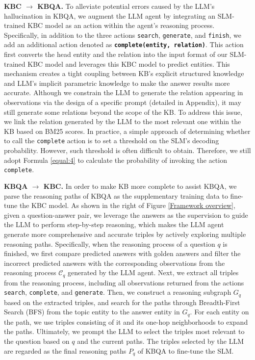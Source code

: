 \documentclass[11pt]{article}
\begin{document}
\textbf{KBC $\rightarrow$ KBQA.}\label{sec:3.3.1}
To alleviate potential errors caused by the LLM's hallucination in KBQA, we augment the LLM agent by integrating an SLM-trained KBC model as an action within the agent's reasoning process. Specifically, in addition to the three actions \texttt{search}, \texttt{generate}, and \texttt{finish}, we add an additional action denoted as \textbf{\texttt{complete(entity, relation)}}. This action first converts the head entity and the relation into the input format of our SLM-trained KBC model and leverages this KBC model to predict entities. This mechanism creates a tight coupling between KB's explicit structured knowledge and LLM's implicit parametric knowledge to make the answer results more accurate.
Although we constrain the LLM to generate the relation appearing in observations via the design of a specific prompt (detailed in Appendix), it may still generate some relations beyond the scope of the KB. 
To address this issue, we link the relation generated by the LLM to the most relevant one within the KB based on BM25 scores. 
In practice, a simple approach of determining whether to call the \texttt{complete} action is to set a threshold on the SLM’s decoding probability. However, such threshold is often difficult to obtain. Therefore, we still adopt Formula \ref{equal:4} to calculate the probability of invoking the action \texttt{complete}.

\textbf{KBQA $\rightarrow$ KBC.}\label{sec:3.3.2} 
In order to make KB more complete to assist KBQA, we parse the reasoning paths of KBQA as the supplementary training data to fine-tune the KBC model. As shown in the right of Figure \ref{Framework overview}, given a question-answer pair, we leverage the answers as the supervision to guide the LLM to perform step-by-step reasoning, which makes the LLM agent generate more comprehensive and accurate triples by actively exploring multiple reasoning paths. Specifically, when the reasoning process of a question $q$ is finished, we first compare predicted answers with golden answers and filter the incorrect predicted answers with the corresponding observations from the reasoning process $\mathcal{C}_q$ generated by the LLM agent. 
Next, we extract all triples from the reasoning process, including all observations returned from the actions \texttt{search}, \texttt{complete}, and \texttt{generate}. Then, we construct a reasoning subgraph $G_q$ based on the extracted triples, and search for the paths through Breadth-First Search (BFS) from the topic entity to the answer entity in $G_q$. For each entity on the path, we use triples consisting of it and its one-hop neighborhoods to expand the paths. Ultimately, we prompt the LLM to select the triples most relevant to the question based on $q$ and the current paths. The triples selected by the LLM are regarded as the final reasoning paths $P_q$ of KBQA to fine-tune the SLM. 
\end{document}
